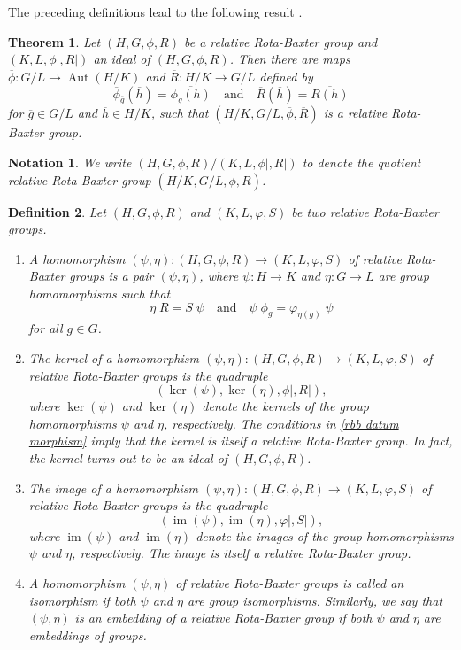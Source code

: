 \documentclass[11pt]{amsart}
\theoremstyle{thrm}
\theoremstyle{plain}
\newtheorem{no}{Notation}[section]
\newtheorem{thm}{Theorem}[section]
\newtheorem{defn}[thm]{Definition}
\theoremstyle{definition}
\newcommand{\Aut}{\operatorname{Aut} }
\newcommand{\Ker}{\operatorname{ker} }
\newcommand{\IM}{\operatorname{im} }
\numberwithin{equation}{section}
\begin{document}
The preceding definitions lead to the following result \cite[Theorem 5.3]{NM1}.

\begin{thm}\label{subs}
	Let $(H, G, \phi, R)$ be a relative Rota-Baxter group and $(K, L,  \phi|, R|)$ an ideal of $(H, G, \phi, R)$. Then there are maps $\overline{\phi}: G/L \to \Aut(H/K)$ and  $\overline{R}: H/K \to G/L$ defined by
	$$ \overline{\phi}_{\overline{g}}(\overline{h})=\overline{\phi_{g}(h)} \quad \textrm{and} \quad	\overline{R}(\overline{h})=\overline{R(h)}$$
	for $\overline{g} \in G/L$ and $\overline{h} \in H/K$, such that  $(H/K, G/L, \overline{\phi}, \overline{R})$ is a relative Rota-Baxter group.
\end{thm}
\begin{no}
	We write $(H, G, \phi, R)/(K, L, \phi|, R|)$ to denote the quotient relative Rota-Baxter group $(H/K, G/L, \overline{\phi}, \overline{R})$.
\end{no}


\begin{defn}
	Let $(H, G, \phi, R)$ and $(K, L, \varphi, S)$ be two relative Rota-Baxter groups.
	\begin{enumerate}
		\item A homomorphism $(\psi, \eta): (H, G, \phi, R) \to (K, L, \varphi, S)$ of relative Rota-Baxter groups is a pair $(\psi, \eta)$, where $\psi: H \rightarrow K$ and $\eta: G \rightarrow L$ are group homomorphisms such that
		\begin{equation}\label{rbb datum morphism}
			\eta \; R = S \; \psi \quad \textrm{and} \quad \psi \; \phi_g =  \varphi_{\eta(g)}\; \psi
		\end{equation}
for all $g \in G$.
		\item The kernel of a homomorphism $(\psi, \eta): (H, G, \phi, R) \to (K, L, \varphi, S)$ of relative Rota-Baxter groups is the quadruple $$(\Ker(\psi), \Ker(\eta), \phi|, R|),$$ where $\Ker(\psi)$ and $\Ker(\eta)$ denote the kernels of the group homomorphisms $\psi$ and $\eta$, respectively. The conditions in \eqref{rbb datum morphism} imply that the kernel is itself a relative Rota-Baxter group. In fact, the kernel turns out to be an ideal of $(H, G, \phi, R)$.
		
		\item The image of a homomorphism $(\psi, \eta):  (H, G, \phi, R) \to (K, L, \varphi, S)$ of relative Rota-Baxter groups is the quadruple 
		$$(\IM(\psi), \IM(\eta), \varphi|, S| ),$$ where $\IM(\psi)$ and $\IM(\eta)$ denote the images of the group homomorphisms $\psi$ and $\eta$, respectively. The image is itself a relative Rota-Baxter group.
		
		\item A homomorphism $(\psi, \eta)$ of relative Rota-Baxter groups is called an isomorphism if both $\psi$ and $\eta$ are group isomorphisms. Similarly, we say that $(\psi, \eta)$ is an embedding of a relative Rota-Baxter group if both $\psi$ and $\eta$ are embeddings of groups.
	\end{enumerate}
\end{defn}
\end{document}
